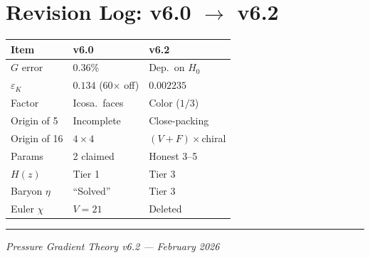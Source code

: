 \documentclass[12pt,a4paper,twocolumn]{article}
\begin{document}
\section{Revision Log: v6.0 $\to$ v6.2}
\label{app:revisions}

\begin{center}
\small
\begin{tabular}{@{}lll@{}}
\toprule
Item & v6.0 & v6.2 \\
\midrule
$G$ error & 0.36\% & Dep.\ on $H_0$ \\
$\varepsilon_K$ & $0.134$ (60$\times$ off) & $0.002235$ \\
Factor & Icosa.\ faces & Color ($1/3$) \\
Origin of 5 & Incomplete & Close-packing \\
Origin of 16 & $4\!\times\!4$ & $(V\!+\!F)\!\times\!$chiral \\
Params & 2 claimed & Honest 3--5 \\
$H(z)$ & Tier 1 & Tier 3 \\
Baryon $\eta$ & ``Solved'' & Tier 3 \\
Euler $\chi$ & $V\!=\!21$ & Deleted \\
\bottomrule
\end{tabular}
\end{center}

\vspace{1em}
\hrule
\vspace{0.5em}
\begin{center}
\small\itshape Pressure Gradient Theory v6.2 --- February 2026
\end{center}
\end{document}
